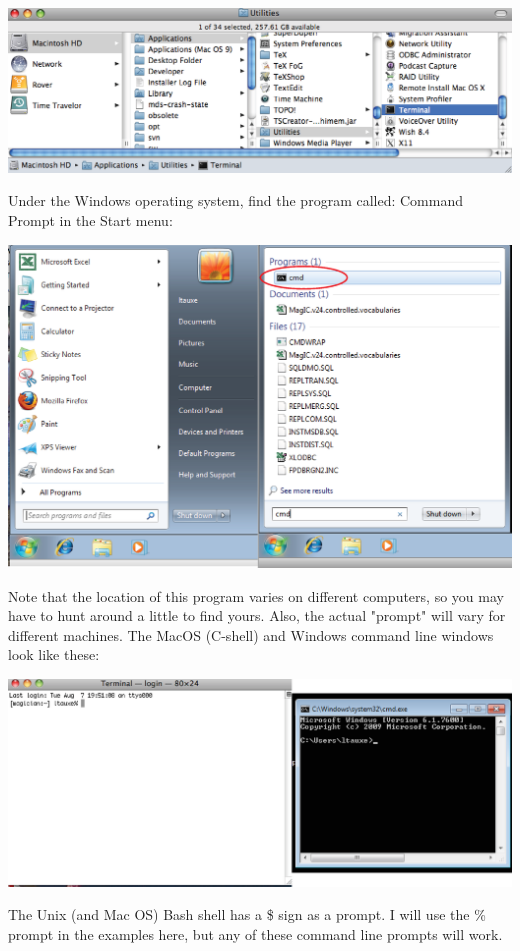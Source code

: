 \documentclass[11pt]{book}
\begin{document}
{  \includegraphics[width=15cm]{EPSfiles/terminal.eps}

Under the Windows operating system, find the program called: Command Prompt in the Start menu:

  \includegraphics[width=15cm]{EPSfiles/cmd.eps}
  
  Note that the location of this program varies on different computers, so you may have to hunt around a little to find yours. Also, the actual "prompt" will vary for different machines. The MacOS (C-shell) and Windows command line windows look like these:
  
    \includegraphics[width=15cm]{EPSfiles/terminals.eps}
    
The Unix (and Mac OS) Bash shell has a \$ sign as a prompt.   I will use the \% prompt in the examples here, but any of these command line prompts will work.    
  
}
\end{document}
